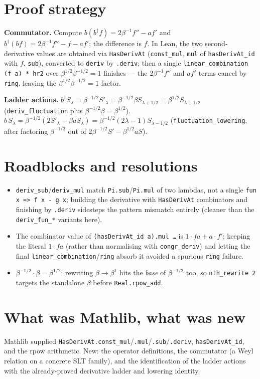 \documentclass[11pt]{article}
\begin{document}
\section{Proof strategy}
\textbf{Commutator.} Compute $b(b^\dagger f)=2\beta^{-1}f''-a f'$ and
$b^\dagger(b f)=2\beta^{-1}f''-f-a f'$; the difference is $f$. In Lean, the two second-derivative
values are obtained via \texttt{HasDerivAt} (\texttt{const\_mul}, \texttt{mul} of \texttt{hasDerivAt\_id}
with $f$, \texttt{sub}), converted to \texttt{deriv} by \texttt{.deriv}; then a single
\texttt{linear\_combination (f a) * hr2} over $\beta^{1/2}\beta^{-1/2}=1$ finishes --- the $2\beta^{-1}
f''$ and $a f'$ terms cancel by \texttt{ring}, leaving the $\beta^{1/2}\beta^{-1/2}=1$ factor.

\textbf{Ladder actions.} $b^\dagger S_\lambda=\beta^{-1/2}S'_\lambda=\beta^{-1/2}\beta S_{\lambda+1/2}
=\beta^{1/2}S_{\lambda+1/2}$ (\texttt{deriv\_fluctuation} plus $\beta^{-1/2}\beta=\beta^{1/2}$).
$b\,S_\lambda=\beta^{-1/2}(2S'_\lambda-\beta a S_\lambda)=\beta^{-1/2}(2\lambda-1)S_{\lambda-1/2}$
(\texttt{fluctuation\_lowering}, after factoring $\beta^{-1/2}$ out of $2\beta^{-1/2}S'-\beta^{1/2}aS$).

\section{Roadblocks and resolutions}
\begin{itemize}
\item \texttt{deriv\_sub}/\texttt{deriv\_mul} match \texttt{Pi.sub}/\texttt{Pi.mul} of two lambdas, not a
single \texttt{fun x => f x - g x}; building the derivative with \texttt{HasDerivAt} combinators and
finishing by \texttt{.deriv} sidesteps the pattern mismatch entirely (cleaner than the
\texttt{deriv\_fun\_*} variants here).
\item The combinator value of \texttt{(hasDerivAt\_id a).mul \ldots} is $1\cdot f a+a\cdot f'$; keeping
the literal $1\cdot f a$ (rather than normalising with \texttt{congr\_deriv}) and letting the final
\texttt{linear\_combination}/\texttt{ring} absorb it avoided a spurious \texttt{ring} failure.
\item $\beta^{-1/2}\cdot\beta=\beta^{1/2}$: rewriting $\beta\to\beta^1$ hits the \emph{base} of
$\beta^{-1/2}$ too, so \texttt{nth\_rewrite 2} targets the standalone $\beta$ before
\texttt{Real.rpow\_add}.
\end{itemize}

\section{What was Mathlib, what was new}
Mathlib supplied \texttt{HasDerivAt.const\_mul}/\texttt{.mul}/\texttt{.sub}/\texttt{.deriv},
\texttt{hasDerivAt\_id}, and the rpow arithmetic. New: the operator definitions, the commutator (a Weyl
relation on a concrete SLT family), and the identification of the ladder actions with the already-proved
derivative ladder and lowering identity.
\end{document}

